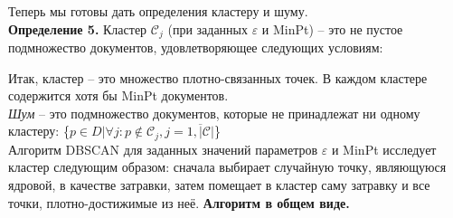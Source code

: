 Теперь мы готовы дать определения кластеру и шуму.\\ 
\indent\textbf{Определение 5.} Кластер \(\mathcal{C}_j\) (при заданных \(\varepsilon\) и MinPt) – это не пустое подмножество документов, удовлетворяющее следующих условиям: 

\indent Итак, кластер – это множество плотно-связанных точек. В каждом кластере 
содержится хотя бы MinPt документов. \\
\indent\textit{Шум} – это подмножество документов, которые не принадлежат ни одному 
кластеру: \{\( p \in D |  \forall j: p \notin \mathcal{C}_j , j = \overline{ 1, |\mathcal{C}|}\)\}\\
\indent Алгоритм DBSCAN для заданных значений параметров \(\varepsilon\) и MinPt исследует кластер следующим образом: сначала выбирает случайную точку, являющуюся ядровой, в качестве затравки, затем помещает в кластер саму затравку и все точки, плотно-достижимые из неё. 
\clearpage
\textbf{Алгоритм в общем виде.}

